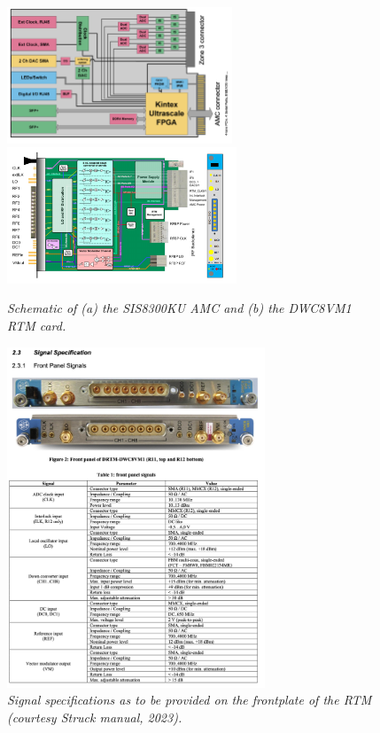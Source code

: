 \documentclass[12pt]{amsart}
\begin{document}
\begin{figure}[htbp] %
   \centering
   \includegraphics[height=1.6in]{im/sis.png} 
   \includegraphics[height=1.6in]{im/rtm.png} 
   \caption{\em Schematic of (a) the SIS8300KU AMC and (b) the DWC8VM1 RTM card.}
   \label{fig:card}
\end{figure}
 


\begin{figure}[htbp] %
   \centering
   \includegraphics[height=4in]{im/RTM_fp_signals.jpeg}
   \caption{\em Signal specifications as to be provided on the frontplate of the RTM (courtesy Struck manual, 2023).}
   \label{fig:fp}
\end{figure}
\end{document}

